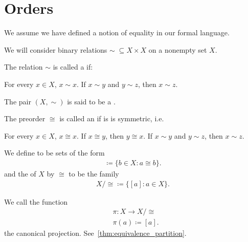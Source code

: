 \section{Orders}\label{sec:orders}

We assume we have defined a notion of equality in our formal language.

\begin{definition}\label{def:order}
  We will consider binary relations $\sim\; \subseteq X \times X$ on a nonempty set $X$.

  \begin{defenum}
    \item\label{def:order/preorder}\cite{nLab:preorder} The relation $\sim$ is called a  if:
    \begin{description}
       For every $x \in X$, $x \sim x$.
       If $x \sim y$ and $y \sim z$, then $x \sim z$.
    \end{description}

    The pair $(X, \sim)$ is said to be a .

    \item\label{def:order/equivalence}\cite[56]{Enderton1977} The preorder $\cong$ is called an  if is is symmetric, i.e.
    \begin{description}
       For every $x \in X$, $x \cong x$.
       If $x \cong y$, then $y \cong x$.
       If $x \sim y$ and $y \sim z$, then $x \sim z$.
    \end{description}

    We define  to be sets of the form
    \begin{align*}
      [a] \coloneqq \{ b \in X \colon a \cong b \}.
    \end{align*}
    and the  of $X$ by $\cong$ to be the family
    \begin{align*}
      X / \cong \coloneqq \{ [a] \colon a \in X \}.
    \end{align*}

    We call the function
    \begin{align*}
      &\pi: X \to X / \cong \\
      &\pi(a) \coloneqq [a].
    \end{align*}
    the canonical projection. See~\cref{thm:equivalence_partition}.


\end{defenum}
\end{definition}
